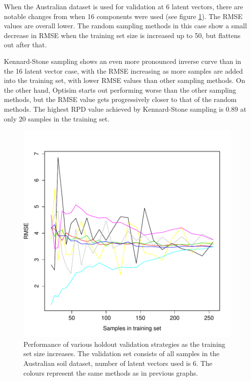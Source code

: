 \documentclass{isprs}
\begin{document}
When the Australian dataset is used for validation at 6 latent vectors, there are notable changes from when 16 components were used (see figure \ref{fig:rmse-au-6}). The RMSE values are overall lower. The random sampling methods in this case show a small decrease in RMSE when the training set size is increased up to 50, but flattens out after that.

Kennard-Stone sampling shows an even more pronounced inverse curve than in the 16 latent vector case, with the RMSE increasing as more samples are added into the training set, with lower RMSE values than other sampling methods. On the other hand, Optisim starts out performing worse than the other sampling methods, but the RMSE value gets progressively closer to that of the random methods. The highest RPD value achieved by Kennard-Stone sampling is 0.89 at only 20 samples in the training set.

\begin{figure}[ht!]
\includegraphics[width=1.0\columnwidth]{../script/output/rmse-au-6.pdf}
\begin{center}
    \caption{Performance of various holdout validation strategies as the training set size increases. The validation set consists of all samples in the Australian soil dataset, number of latent vectors used is 6. The colours represent the same methods as in previous graphs.}
    \label{fig:rmse-au-6}
\end{center}
\end{figure}
\end{document}
